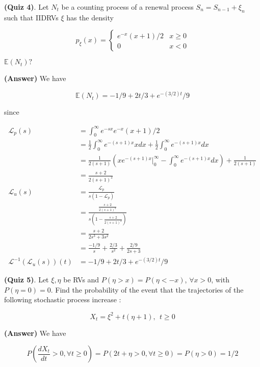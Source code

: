 \documentclass[12pt]{article}
\theoremstyle{nonumberbreak}
\begin{document}
\textbf{(Quiz 4)}. Let $N_t$ be a counting process of a renewal process $S_n = S_{n-1} + \xi_n$ such that IIDRVs $\xi$ has the density

$$
p_\xi (x) = \begin{cases}
e^{-x} (x+1)/2 & x \ge 0 \\
0 & x <0
\end{cases}
$$

$\mathbb{E}(N_t)?$

\textbf{(Answer)} We have

$$
\mathbb{E}(N_t) = -1/9 + 2t/3 + e^{-(3/2)t}/9
$$

since 

$$
\begin{aligned}
\mathcal{L}_p (s) &= \int_0^\infty e^{-sx} e^{-x}(x+1)/2 \\[8pt]
&= \frac{1}{2} \int_0^\infty e^{-(s+1)x} x dx + \frac{1}{2} \int_0^\infty e^{-(s+1)x}dx  \\[8pt]
&= \frac{1}{2(s+1)} (xe^{-(s+1)x} \vert_0^\infty - \int_0^\infty e^{-(s+1)x} dx ) + \frac{1}{2(s+1)} \\[8pt]
&= \frac{s+2}{2(s+1)^2}\\[10pt]
\mathcal{L}_u (s) &= \frac{\mathcal{L}_p}{s(1-\mathcal{L}_p)} \\[8pt]
&= \frac{\frac{s+2}{2(s+1)^2}}{s(1-\frac{s+2}{2(s+1)^2})} \\[8pt]
&= \frac{s+2}{2s^3 + 3s^2} \\[8pt]
&= \frac{-1/9}{s} + \frac{2/3}{s^2} + \frac{2/9}{2s+3} \\[10pt]
\mathcal{L}^{-1}(\mathcal{L}_u (s))(t) &= -1/9 + 2t/3 + e^{-(3/2)t}/9
\end{aligned}
$$


\textbf{(Quiz 5)}. Let $\xi, \eta$ be RVs and $P(\eta > x) = P (\eta < -x)$, $\forall x >0$, with $P(\eta=0) = 0$. Find the probability of the event that the trajectories of the following stochastic process increase :

$$
X_t = \xi^2 + t(\eta + 1), \ \ t \ge 0
$$

\textbf{(Answer)} We have

$$
P(\frac{d X_t}{dt} > 0,\forall t\ge0) = P(2t + \eta > 0,\forall t\ge0) = P(\eta >0) = 1/2
$$











\pagebreak
\end{document}
